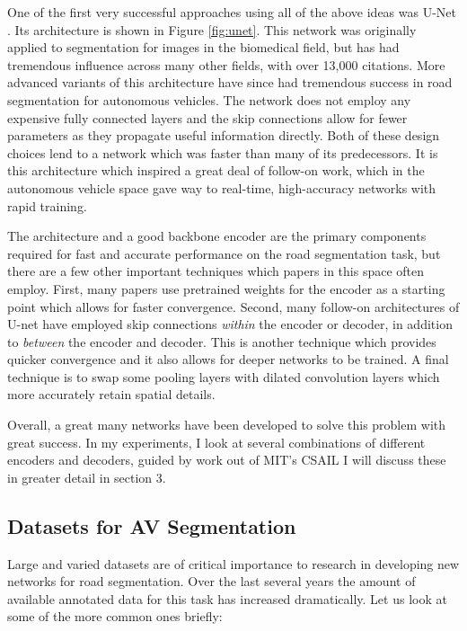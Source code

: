 \documentclass[10pt,twocolumn,letterpaper]{article}
\begin{document}
One of the first very successful approaches using all of the above ideas was U-Net \cite{Ronneberger_2015}. Its architecture is shown in Figure \ref{fig:unet}. This network was originally applied to segmentation for images in the biomedical field, but has had tremendous influence across many other fields, with over 13,000 citations. More advanced variants of this architecture have since had tremendous success in road segmentation for autonomous vehicles. The network does not employ any expensive fully connected layers and the skip connections allow for fewer parameters as they propagate useful information directly. Both of these design choices lend to a network which was faster than many of its predecessors. It is this architecture which inspired a great deal of follow-on work, which in the autonomous vehicle space gave way to real-time, high-accuracy networks with rapid training.

The architecture and a good backbone encoder are the primary components required for fast and accurate performance on the road segmentation task, but there are a few other important techniques which papers in this space often employ. First, many papers use pretrained weights for the encoder as a starting point which allows for faster convergence. Second, many follow-on architectures of U-net have employed skip connections \textit{within} the encoder or decoder, in addition to \textit{between} the encoder and decoder. This is another technique which provides quicker convergence and it also allows for deeper networks to be trained. A final technique is to swap some pooling layers with dilated convolution layers which more accurately retain spatial details.

Overall, a great many networks have been developed to solve this problem with great success. In my experiments, I look at several combinations of different encoders and decoders, guided by work out of MIT's CSAIL I will discuss these in greater detail in section 3.

\subsection{Datasets for AV Segmentation}
Large and varied datasets are of critical importance to research in developing new networks for road segmentation. Over the last several years the amount of available annotated data for this task has increased dramatically. Let us look at some of the more common ones briefly:
\end{document}
